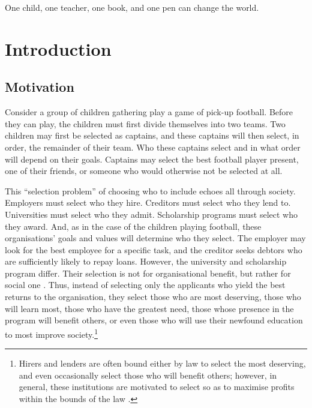 \begin{savequote}[8cm]
    One child, one teacher, one book, and one pen can change the world.
\end{savequote}

\chapter{\label{ch:intro}Introduction} 

\minitoc

\section{Motivation}

Consider a group of children gathering play a game of pick-up football. Before they can play, the children must first divide themselves into two teams. Two children may first be selected as captains, and these captains will then select, in order, the remainder of their team. Who these captains select and in what order will depend on their goals. Captains may select the best football player present, one of their friends, or someone who would otherwise not be selected at all.

This ``selection problem'' of choosing who to include echoes all through society. Employers must select who they hire. Creditors must select who they lend to. Universities must select who they admit. Scholarship programs must select who they award. And, as in the case of the children playing football, these organisations' goals and values will determine who they select. The employer may look for the best employee for a specific task, and the creditor seeks debtors who are sufficiently likely to repay loans. However, the university and scholarship program differ. Their selection is not for organisational benefit, but rather for social one \cite{Warikoo_2019}. Thus, instead of selecting only the applicants who yield the best returns to the organisation, they select those who are most deserving, those who will learn most, those who have the greatest need, those whose presence in the program will benefit others, or even those who will use their newfound education to most improve society.\footnote{Hirers and lenders are often bound either by law to select the most deserving, and even occasionally select those who will benefit others; however, in general, these institutions are motivated to select so as to maximise profits within the bounds of the law \cite{schmidt1998validity}.}

